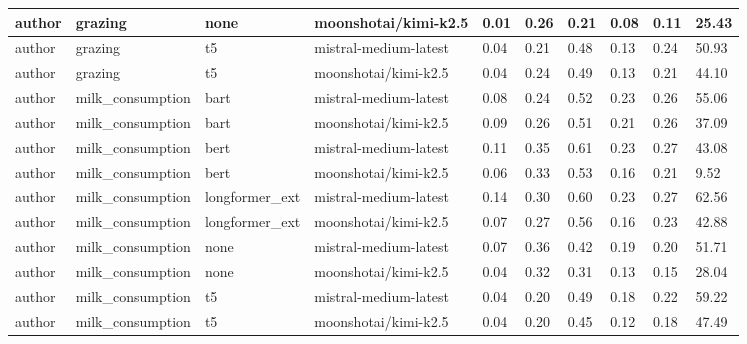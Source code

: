 \begin{tabular}{|l|l|l|l|l|l|l|l|l|l|}
 \hline
 author & grazing & none & moonshotai/kimi-k2.5 & 0.01 & 0.26 & 0.21 & 0.08 & 0.11 & 25.43 \\
 \hline
 author & grazing & t5 & mistral-medium-latest & 0.04 & 0.21 & 0.48 & 0.13 & 0.24 & 50.93 \\
 \hline
 author & grazing & t5 & moonshotai/kimi-k2.5 & 0.04 & 0.24 & 0.49 & 0.13 & 0.21 & 44.10 \\
 \hline
 author & milk\_consumption & bart & mistral-medium-latest & 0.08 & 0.24 & 0.52 & 0.23 & 0.26 & 55.06 \\
 \hline
 author & milk\_consumption & bart & moonshotai/kimi-k2.5 & 0.09 & 0.26 & 0.51 & 0.21 & 0.26 & 37.09 \\
 \hline
 author & milk\_consumption & bert & mistral-medium-latest & 0.11 & 0.35 & 0.61 & 0.23 & 0.27 & 43.08 \\
 \hline
 author & milk\_consumption & bert & moonshotai/kimi-k2.5 & 0.06 & 0.33 & 0.53 & 0.16 & 0.21 & 9.52 \\
 \hline
 author & milk\_consumption & longformer\_ext & mistral-medium-latest & 0.14 & 0.30 & 0.60 & 0.23 & 0.27 & 62.56 \\
 \hline
 author & milk\_consumption & longformer\_ext & moonshotai/kimi-k2.5 & 0.07 & 0.27 & 0.56 & 0.16 & 0.23 & 42.88 \\
 \hline
 author & milk\_consumption & none & mistral-medium-latest & 0.07 & 0.36 & 0.42 & 0.19 & 0.20 & 51.71 \\
 \hline
 author & milk\_consumption & none & moonshotai/kimi-k2.5 & 0.04 & 0.32 & 0.31 & 0.13 & 0.15 & 28.04 \\
 \hline
 author & milk\_consumption & t5 & mistral-medium-latest & 0.04 & 0.20 & 0.49 & 0.18 & 0.22 & 59.22 \\
 \hline
 author & milk\_consumption & t5 & moonshotai/kimi-k2.5 & 0.04 & 0.20 & 0.45 & 0.12 & 0.18 & 47.49 \\
\hline
\end{tabular}
